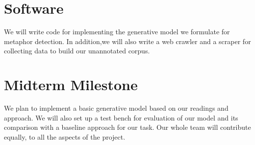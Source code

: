 \documentclass{article} %
\begin{document}
\section{Software}
We will write code for implementing the generative model we formulate for metaphor detection. In addition,we will also write a web crawler and a scraper for collecting data to build our unannotated corpus.

\section{Midterm Milestone}
We plan to implement a basic generative model based on our readings and approach. We will also set up a test bench for evaluation of our model and its comparison with a baseline approach for our task. Our whole team will contribute equally, to all the aspects of the project.








\end{document}
